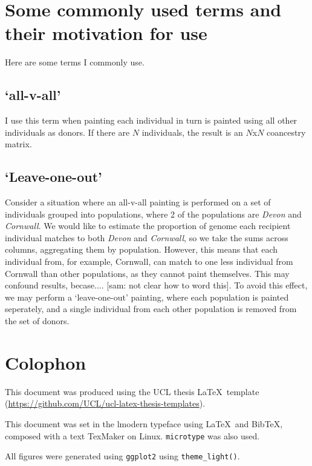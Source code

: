 \chapter{Some commonly used terms and their motivation for use}
\label{appendixlabel2}

Here are some terms I commonly use.

\section{`all-v-all'}

I use this term when painting each individual in turn is painted using all other individuals as donors. If there are $N$ individuals, the result is an $N$x$N$ coancestry matrix.


\section{`Leave-one-out'}

Consider a situation where an all-v-all painting is performed on a set of individuals grouped into populations, where 2 of the populations are \textit{Devon} and \textit{Cornwall}. We would like to estimate the proportion of genome each recipient individual matches to both \textit{Devon} and \textit{Cornwall}, so we take the sums across columns, aggregating them by population. However, this means that each individual from, for example, Cornwall, can match to one less individual from Cornwall than other populations, as they cannot paint themselves. This may confound results, becase.... [sam: not clear how to word this]. To avoid this effect, we may perform a `leave-one-out' painting, where each population is painted seperately, and a single individual from each other population is removed from the set of donors. 



\chapter{Colophon}
\label{appendixlabel3}

This document was produced using the UCL thesis \LaTeX\ template (\url{https://github.com/UCL/ucl-latex-thesis-templates}).

This document was set in the lmodern typeface using \LaTeX\ and Bib\TeX, composed with a text TexMaker on Linux. \texttt{microtype} was also used.

All figures were generated using \texttt{ggplot2} using \texttt{theme\_light()}.

